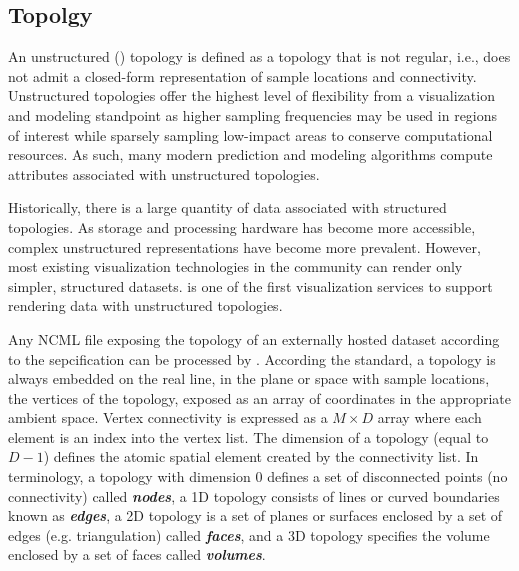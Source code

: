 \subsection{\ugrid{} Topolgy}
An unstructured (\ugrid{}) topology is defined as a topology that is
not regular, i.e., does not admit a closed-form representation of
sample locations and connectivity. Unstructured topologies offer the
highest level of flexibility from a visualization and modeling
standpoint as higher sampling frequencies may be used in regions of
interest while sparsely sampling low-impact areas to conserve
computational resources. As such, many modern \cf{} prediction and
modeling algorithms compute attributes associated with unstructured
topologies.

Historically, there is a large quantity of \cf{} data associated with
structured topologies. As storage and processing hardware has become
more accessible, complex unstructured representations have become more
prevalent. However, most existing visualization technologies in the
\cf{} community can render only simpler, structured
datasets. \sciwms{} is one of the first visualization services to
support rendering data with unstructured topologies.

Any NCML file exposing the topology of an externally hosted
dataset according to the \cfugrid{} sepcification can be processed by
\sciwms{}. According the \cfugrid{} standard, a topology is always
embedded on the real line, in the plane or space with sample
locations, the vertices of the topology, exposed as an array of
coordinates in the appropriate ambient space. Vertex connectivity is
expressed as a $M \times D$ array where each element is an index into
the vertex list. The dimension of a topology (equal to $D - 1$) defines the
atomic spatial element created by the connectivity list. In \cfugrid{}
terminology, a topology with dimension 0 defines a set of disconnected
points (no connectivity) called \textbf{\textit{nodes}}, a 1D topology
consists of lines or curved boundaries known as
\textbf{\textit{edges}}, a 2D topology is a set of planes or surfaces
enclosed by a set of edges (e.g. triangulation) called
\textbf{\textit{faces}}, and a 3D topology specifies the volume enclosed
by a set of faces called \textbf{\textit{volumes}}.

